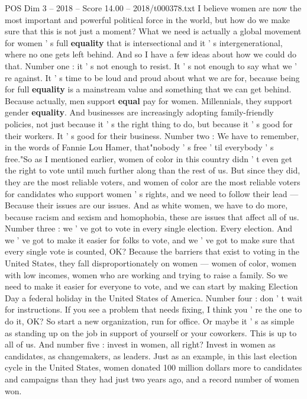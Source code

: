 \begin{textsample}{POS Dim 3 – 2018 – Score 14.00 – 2018/t000378.txt}
I believe women are now the most important and powerful political force in the world, but how do we make sure that this is not just a moment?
What we need is actually a global movement for women ' s full \textbf{equality} that is intersectional and it ' s intergenerational, where no one gets left behind.
And so I have a few ideas about how we could do that.
Number one : it ' s not enough to resist.
It ' s not enough to say what we ' re against.
It ' s time to be loud and proud about what we are for, because being for full \textbf{equality} is a mainstream value and something that we can get behind.
Because actually, men support \textbf{equal} pay for women.
Millennials, they support gender \textbf{equality}.
And businesses are increasingly adopting family-friendly policies, not just because it ' s the right thing to do, but because it ' s good for their workers.
It ' s good for their business.
Number two : We have to remember, in the words of Fannie Lou Hamer, that"nobody ' s free ' til everybody ' s free."So as I mentioned earlier, women of color in this country didn ' t even get the right to vote until much further along than the rest of us.
But since they did, they are the most reliable voters, and women of color are the most reliable voters for candidates who support women ' s rights, and we need to follow their lead — Because their issues are our issues.
And as white women, we have to do more, because racism and sexism and homophobia, these are issues that affect all of us.
Number three : we ' ve got to vote in every single election.
Every election.
And we ' ve got to make it easier for folks to vote, and we ' ve got to make sure that every single vote is counted, OK?
Because the barriers that exist to voting in the United States, they fall disproportionately on women — women of color, women with low incomes, women who are working and trying to raise a family.
So we need to make it easier for everyone to vote, and we can start by making Election Day a federal holiday in the United States of America.
Number four : don ' t wait for instructions.
If you see a problem that needs fixing, I think you ' re the one to do it, OK?
So start a new organization, run for office.
Or maybe it ' s as simple as standing up on the job in support of yourself or your coworkers.
This is up to all of us.
And number five : invest in women, all right?
Invest in women as candidates, as changemakers, as leaders.
Just as an example, in this last election cycle in the United States, women donated 100 million dollars more to candidates and campaigns than they had just two years ago, and a record number of women won.

\end{textsample}
